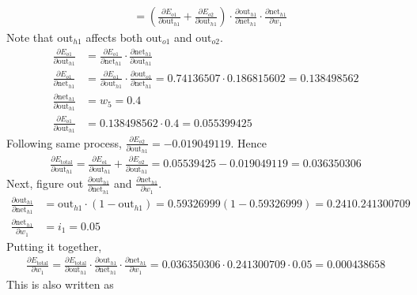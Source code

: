 \begin{example}
\begin{align}
&= \left(\frac{\partial E_{o1}}{\partial \text{out}_{h1}} + \frac{\partial E_{o2}}{\partial \text{out}_{h1}} \right) \cdot \frac{\partial \text{out}_{h1}}{\partial \text{net}_{h1}} \cdot \frac{\partial \text{net}_{h1}}{\partial w_1} \nonumber
\end{align}
Note that $\text{out}_{h1}$ affects both $\text{out}_{o1}$ and $\text{out}_{o2}$.
\begin{align}
\frac{\partial E_{o1}}{\partial \text{out}_{h1}} &= \frac{\partial E_{o1}}{\partial \text{net}_{h1}} \cdot \frac{\partial \text{net}_{h1}}{\partial \text{out}_{h1}} \nonumber \\
\frac{\partial E_{o1}}{\partial \text{net}_{h1}} &= \frac{\partial E_{o1}}{\partial \text{out}_{h1}} \cdot \frac{\partial \text{out}_{o1}}{\partial \text{net}_{h1}} = 0.74136507 \cdot 0.186815602 = 0.138498562 \nonumber \\
\frac{\partial \text{net}_{h1}}{\partial \text{out}_{h1}} &= w_5 = 0.4 \nonumber \\
\frac{\partial E_{o1}}{\partial \text{out}_{h1}} &= 0.138498562 \cdot 0.4 = 0.055399425 \nonumber
\end{align}
Following same process, $\frac{\partial E_{o2}}{\partial \text{out}_{h1}} = -0.019049119$. Hence
\begin{align}
\frac{\partial E_{\text{total}}}{\partial \text{out}_{h1}} = \frac{\partial E_{o1}}{\partial \text{out}_{h1}} + \frac{\partial E_{o2}}{\partial \text{out}_{h1}} = 0.05539425 - 0.019049119 = 0.036350306 \nonumber
\end{align}
Next, figure out $\frac{\partial \text{out}_{h1}}{\partial \text{net}_{h1}}$ and $\frac{\partial \text{net}_{h1}}{\partial w_1}$.
\begin{align}
\frac{\partial \text{out}_{h1}}{\partial \text{net}_{h1}} &= \text{out}_{h1} \cdot (1 - \text{out}_{h1}) = 0.59326999(1-0.59326999) =0.241 0.241300709 \nonumber \\
\frac{\partial \text{net}_{h1}}{\partial w_1} &= i_1 = 0.05 \nonumber
\end{align}
Putting it together,
\begin{align}
\frac{\partial E_{\text{total}}}{\partial w_1} = \frac{\partial E_{\text{total}}}{\partial \text{out}_{h1}} \cdot \frac{\partial \text{out}_{h1}}{\partial \text{net}_{h1}} \cdot \frac{\partial \text{net}_{h1}}{\partial w_1} = 0.036350306 \cdot 0.241300709 \cdot 0.05 = 0.000438658 \nonumber
\end{align}
This is also written as
\begin{align}

\end{align}
\end{example}
